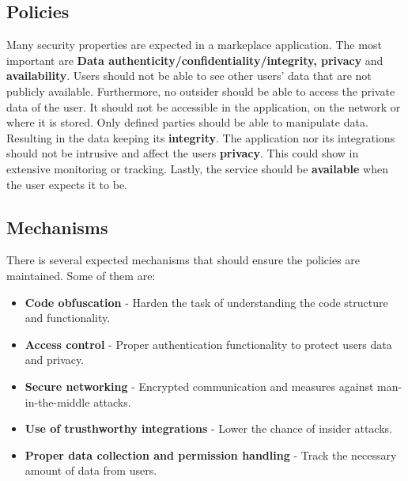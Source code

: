 \subsection{Policies}
Many security properties are expected in a markeplace application. The most important are \textbf{Data authenticity/confidentiality/integrity, privacy} and \textbf{availability}. Users should not be able to see other users' data that are not publicly available. Furthermore, no outsider should be able to access the private data of the user. It should not be accessible in the application, on the network or where it is stored. Only defined parties should be able to manipulate data. Resulting in the data keeping its \textbf{integrity}. The application nor its integrations should not be intrusive and affect the users \textbf{privacy}. This could show in extensive monitoring or tracking. Lastly, the service should be \textbf{available} when the user expects it to be.      

\subsection{Mechanisms}
There is several expected mechanisms that should ensure the policies are maintained. Some of them are:

\begin{itemize}
    \item \textbf{Code obfuscation}  - Harden the task of understanding the code structure and functionality. 
    \item \textbf{Access control}  - Proper authentication functionality to protect users data and privacy. 
    \item \textbf{Secure networking}  - Encrypted communication and measures against man-in-the-middle attacks. 
    \item \textbf{Use of trusthworthy integrations}  - Lower the chance of insider attacks. 
    \item \textbf{Proper data collection and permission handling}  - Track the necessary amount of data from users. 
\end{itemize}
      
